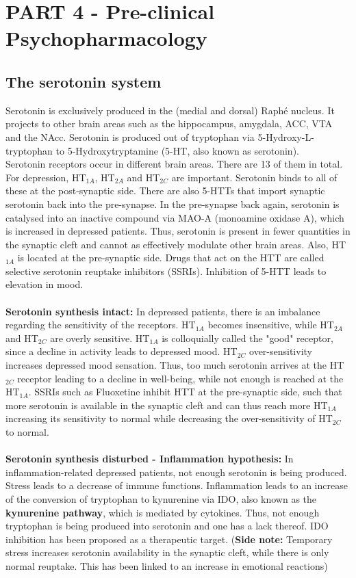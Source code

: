 \documentclass[twosided, a4paper, pt11]{article}
\begin{document}
	
	\section{PART 4 - Pre-clinical Psychopharmacology}
	\subsection{The serotonin system}
	Serotonin is exclusively produced in the (medial and dorsal) Raph\'e nucleus. It projects to other brain areas such as the hippocampus, amygdala, ACC, VTA and the NAcc. Serotonin is produced out of tryptophan via 5-Hydroxy-L-tryptophan to 5-Hydroxytryptamine (5-HT, also known as serotonin). \\
	Serotonin receptors occur in different brain areas. There are 13 of them in total. For depression, HT$_{1A}$, HT$_{2A}$ and HT$_{2C}$ are important. Serotonin binds to all of these at the post-synaptic side. There are also 5-HTTs that import synaptic serotonin back into the pre-synapse. In the pre-synapse back again, serotonin is catalysed into an inactive compound via MAO-A (monoamine oxidase A), which is increased in depressed patients. Thus, serotonin is present in fewer quantities in the synaptic cleft and cannot as effectively modulate other brain areas. Also, HT$_{1A}$ is located at the pre-synaptic side. Drugs that act on the HTT are called selective serotonin reuptake inhibitors (SSRIs). Inhibition of 5-HTT leads to elevation in mood.
	\paragraph{}\textbf{Serotonin synthesis intact: }In depressed patients, there is an imbalance regarding the sensitivity of the receptors. HT$_{1A}$ becomes insensitive, while HT$_{2A}$ and HT$_{2C}$ are overly sensitive. HT$_{1A}$ is colloquially called the "good" receptor, since a decline in activity leads to depressed mood. HT$_{2C}$ over-sensitivity increases depressed mood sensation. Thus, too much serotonin arrives at the HT$_{2C}$ receptor leading to a decline in well-being, while not enough is reached at the HT$_{1A}$. SSRIs such as Fluoxetine inhibit HTT at the pre-synaptic side, such that more serotonin is available in the synaptic cleft and can thus reach more HT$_{1A}$ increasing its sensitivity to normal while decreasing the over-sensitivity of HT$_{2C}$ to normal.
	\paragraph{}\textbf{Serotonin synthesis disturbed - Inflammation hypothesis: }
	In inflammation-related depressed patients, not enough serotonin is being produced. Stress leads to a decrease of immune functions. Inflammation leads to an increase of the conversion of tryptophan to kynurenine via IDO, also known as the \textbf{kynurenine pathway}, which is mediated by cytokines. Thus, not enough tryptophan is being produced into serotonin and one has a lack thereof. IDO inhibition has been proposed as a therapeutic target. (\textbf{Side note: }Temporary stress increases serotonin availability in the synaptic cleft, while there is only normal reuptake. This has been linked to an increase in emotional reactions)
\end{document}
